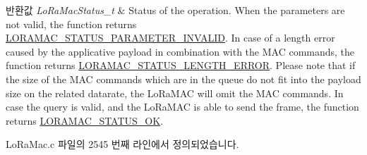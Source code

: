 \begin{DoxyRetVals}{반환값}
{\em Lo\+Ra\+Mac\+Status\+\_\+t} & Status of the operation. When the parameters are not valid, the function returns \mbox{\hyperlink{group___l_o_r_a_m_a_c_gga1d18f26b344040b3ec5c3db662919661ad0d3119f247d00e1787dda106fcb3017}{L\+O\+R\+A\+M\+A\+C\+\_\+\+S\+T\+A\+T\+U\+S\+\_\+\+P\+A\+R\+A\+M\+E\+T\+E\+R\+\_\+\+I\+N\+V\+A\+L\+ID}}. In case of a length error caused by the applicative payload in combination with the M\+AC commands, the function returns \mbox{\hyperlink{group___l_o_r_a_m_a_c_gga1d18f26b344040b3ec5c3db662919661a4ab40311dcd2eeffc77f573a919b29b1}{L\+O\+R\+A\+M\+A\+C\+\_\+\+S\+T\+A\+T\+U\+S\+\_\+\+L\+E\+N\+G\+T\+H\+\_\+\+E\+R\+R\+OR}}. Please note that if the size of the M\+AC commands which are in the queue do not fit into the payload size on the related datarate, the Lo\+Ra\+M\+AC will omit the M\+AC commands. In case the query is valid, and the Lo\+Ra\+M\+AC is able to send the frame, the function returns \mbox{\hyperlink{group___l_o_r_a_m_a_c_gga1d18f26b344040b3ec5c3db662919661a03db5fca052313edb3823c014b653a74}{L\+O\+R\+A\+M\+A\+C\+\_\+\+S\+T\+A\+T\+U\+S\+\_\+\+OK}}. \\
\hline
\end{DoxyRetVals}


Lo\+Ra\+Mac.\+c 파일의 2545 번째 라인에서 정의되었습니다.


